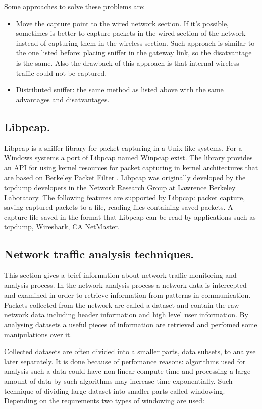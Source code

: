 \documentclass[thesis=M,english]{FITthesis}[2011/07/15]
\begin{document}
Some approaches to solve these problems are\cite{gpu_framework}:
\begin{itemize}
\item Move the capture point to the wired network section. If it's possible, sometimes is better to capture packets in the wired section of the network instead of capturing them in the wireless section. Such approach is similar to the one listed before: placing sniffer in the gateway link, so the disatvantage is the same. Also the drawback of this approach is that internal wireless traffic could not be captured.

\item Distributed sniffer: the same method as listed above with the same advantages and disatvantages.
\end{itemize}

\subsection{Libpcap.}
Libpcap is a sniffer library for packet capturing in a Unix-like systems. For a Windows systems a port of Libpcap named Winpcap \cite{winpcap_site} exist. The library provides an API for using kernel resources for packet capturing in kernel architectures that are based on Berkeley Packet Filter \cite{bsd_filter}. Libpcap was originally developed by the tcpdump developers in the Network Research Group at Lawrence Berkeley Laboratory. The following features are supported by Libpcap: packet capture, saving captured packets to a file, reading files containing saved packets. A capture file saved in the format that Libpcap can be read by applications such as tcpdump, Wireshark, CA NetMaster.

\subsection{Network traffic analysis techniques.}
This section gives a brief information about network traffic monitoring and analysis process. In the network analysis process a network data is intercepted and examined in order to retrieve information from patterns in communication. Packets collected from the network are called a dataset and contain the raw network data including header information and high level user information. By analysing datasets a useful pieces of information are retrieved and perfomed some manipulations over it.

Collected datasets are often divided into a smaller parts, data subsets, to analyse later separately. It is done because of perfomance reasons: algorithms used for analysis such a data could have non-linear compute time and processing a large amount of data by such algorithms may increase time exponentially. Such technique of dividing large dataset into smaller parts called windowing. Depending on the requrements two types of windowing are used:
\end{document}

